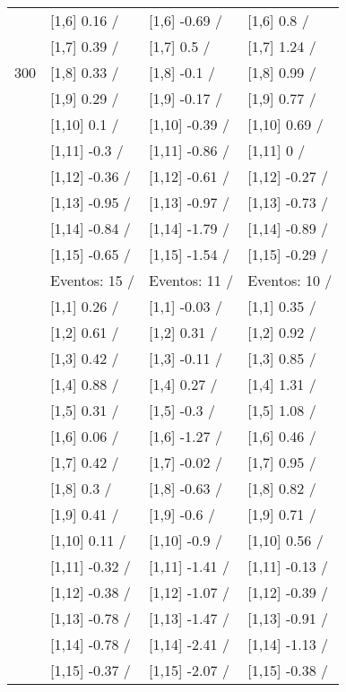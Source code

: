\begin{table}
\begin{tabular}[t]{llll}
 & {}[1,6] 0.16  / & {}[1,6] -0.69  / & {}[1,6] 0.8  /\\
 & {}[1,7] 0.39  / & {}[1,7] 0.5  / & {}[1,7] 1.24  /\\
300 & {}[1,8] 0.33  / & {}[1,8] -0.1  / & {}[1,8] 0.99  /\\
\addlinespace
 & {}[1,9] 0.29  / & {}[1,9] -0.17  / & {}[1,9] 0.77  /\\
 & {}[1,10] 0.1  / & {}[1,10] -0.39  / & {}[1,10] 0.69  /\\
 & {}[1,11] -0.3  / & {}[1,11] -0.86  / & {}[1,11] 0  /\\
 & {}[1,12] -0.36  / & {}[1,12] -0.61  / & {}[1,12] -0.27  /\\
 & {}[1,13] -0.95  / & {}[1,13] -0.97  / & {}[1,13] -0.73  /\\
\addlinespace
 & {}[1,14] -0.84  / & {}[1,14] -1.79  / & {}[1,14] -0.89  /\\
 & {}[1,15] -0.65  / & {}[1,15] -1.54  / & {}[1,15] -0.29  /\\
 & Eventos:  15 / & Eventos:  11 / & Eventos:  10 /\\
 & {}[1,1] 0.26  / & {}[1,1] -0.03  / & {}[1,1] 0.35  /\\
 & {}[1,2] 0.61  / & {}[1,2] 0.31  / & {}[1,2] 0.92  /\\
\addlinespace
 & {}[1,3] 0.42  / & {}[1,3] -0.11  / & {}[1,3] 0.85  /\\
 & {}[1,4] 0.88  / & {}[1,4] 0.27  / & {}[1,4] 1.31  /\\
 & {}[1,5] 0.31  / & {}[1,5] -0.3  / & {}[1,5] 1.08  /\\
 & {}[1,6] 0.06  / & {}[1,6] -1.27  / & {}[1,6] 0.46  /\\
 & {}[1,7] 0.42  / & {}[1,7] -0.02  / & {}[1,7] 0.95  /\\
\addlinespace
500 & {}[1,8] 0.3  / & {}[1,8] -0.63  / & {}[1,8] 0.82  /\\
 & {}[1,9] 0.41  / & {}[1,9] -0.6  / & {}[1,9] 0.71  /\\
 & {}[1,10] 0.11  / & {}[1,10] -0.9  / & {}[1,10] 0.56  /\\
 & {}[1,11] -0.32  / & {}[1,11] -1.41  / & {}[1,11] -0.13  /\\
 & {}[1,12] -0.38  / & {}[1,12] -1.07  / & {}[1,12] -0.39  /\\
\addlinespace
 & {}[1,13] -0.78  / & {}[1,13] -1.47  / & {}[1,13] -0.91  /\\
 & {}[1,14] -0.78  / & {}[1,14] -2.41  / & {}[1,14] -1.13  /\\
 & {}[1,15] -0.37  / & {}[1,15] -2.07  / & {}[1,15] -0.38  /\\
\bottomrule
\end{tabular}
\end{table}
